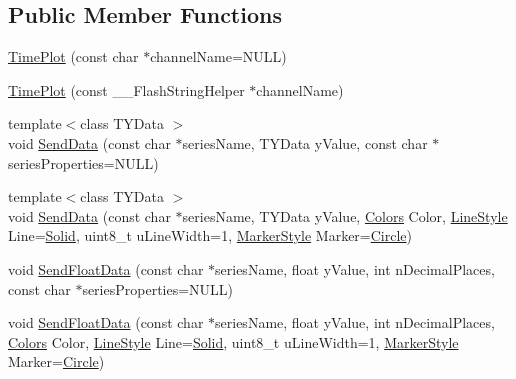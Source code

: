 \subsection*{Public Member Functions}
\begin{DoxyCompactItemize}
\item 
\hyperlink{class_time_plot_a8d0140572be69a6270552b9180ff1e38}{Time\-Plot} (const char $\ast$channel\-Name=N\-U\-L\-L)
\item 
\hyperlink{class_time_plot_a2c5a3ade229494c3d0e285a7d3b55add}{Time\-Plot} (const \-\_\-\-\_\-\-Flash\-String\-Helper $\ast$channel\-Name)
\item 
{\footnotesize template$<$class T\-Y\-Data $>$ }\\void \hyperlink{class_time_plot_a15555221a62dc532d69211d639acf412}{Send\-Data} (const char $\ast$series\-Name, T\-Y\-Data y\-Value, const char $\ast$series\-Properties=N\-U\-L\-L)
\item 
{\footnotesize template$<$class T\-Y\-Data $>$ }\\void \hyperlink{class_time_plot_a72c411fcef4241143981dfe46b8bd0b8}{Send\-Data} (const char $\ast$series\-Name, T\-Y\-Data y\-Value, \hyperlink{class_plot_af4d6704578791a812f3f78617adc7040}{Colors} Color, \hyperlink{class_plot_a05a5ea232f5115847a9861a9660205c7}{Line\-Style} Line=\hyperlink{class_plot_a05a5ea232f5115847a9861a9660205c7a4a144f2b97cc3762d40863bde0853f22}{Solid}, uint8\-\_\-t u\-Line\-Width=1, \hyperlink{class_plot_a888bde9c76bb38843a5ab09097cbeeab}{Marker\-Style} Marker=\hyperlink{class_plot_a888bde9c76bb38843a5ab09097cbeeaba9eb079a6c0fcf4d7125147671b071e2e}{Circle})
\item 
void \hyperlink{class_time_plot_ac28dbd64c6900d80f9ef901d4391f46d}{Send\-Float\-Data} (const char $\ast$series\-Name, float y\-Value, int n\-Decimal\-Places, const char $\ast$series\-Properties=N\-U\-L\-L)
\item 
void \hyperlink{class_time_plot_a69f54f61224cd683732978d314206aec}{Send\-Float\-Data} (const char $\ast$series\-Name, float y\-Value, int n\-Decimal\-Places, \hyperlink{class_plot_af4d6704578791a812f3f78617adc7040}{Colors} Color, \hyperlink{class_plot_a05a5ea232f5115847a9861a9660205c7}{Line\-Style} Line=\hyperlink{class_plot_a05a5ea232f5115847a9861a9660205c7a4a144f2b97cc3762d40863bde0853f22}{Solid}, uint8\-\_\-t u\-Line\-Width=1, \hyperlink{class_plot_a888bde9c76bb38843a5ab09097cbeeab}{Marker\-Style} Marker=\hyperlink{class_plot_a888bde9c76bb38843a5ab09097cbeeaba9eb079a6c0fcf4d7125147671b071e2e}{Circle})
\item 

\end{DoxyCompactItemize}
